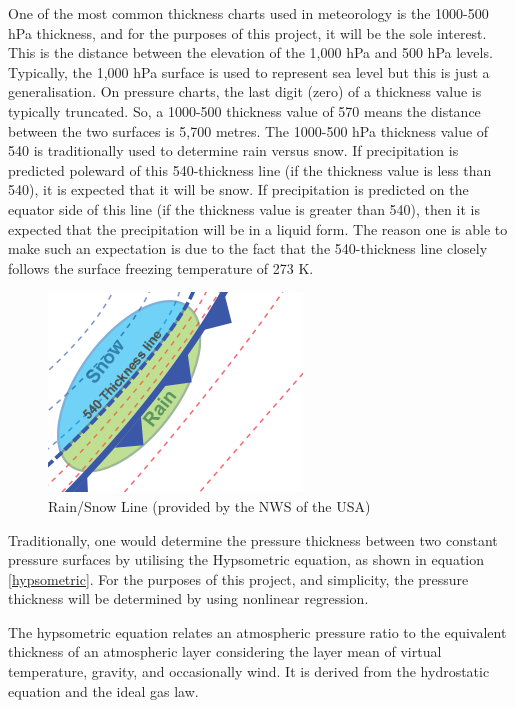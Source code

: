 One of the most common thickness charts used in meteorology is the 1000-500 hPa thickness, and for the purposes of this project, it will be the sole interest. This is the distance between the elevation of the 1,000 hPa and 500 hPa levels. Typically, the 1,000 hPa surface is used to represent sea level but this is just a generalisation. On pressure charts, the last digit (zero) of a thickness value is typically truncated. So, a 1000-500 thickness value of 570 means the distance between the two surfaces is 5,700 metres. The 1000-500 hPa thickness value of 540 is traditionally used to determine rain versus snow. If precipitation is predicted poleward of this 540-thickness line (if the thickness value is less than 540), it is expected that it will be snow. If precipitation is predicted on the equator side of this line (if the thickness value is greater than 540), then it is expected that the precipitation will be in a liquid form. The reason one is able to make such an expectation is due to the fact that the 540-thickness line closely follows the surface freezing temperature of 273 K\cite{thickness}.

\begin{figure}[H]
    \centering
    \includegraphics[width=.4\linewidth]{Images/rainsnow_line.png}
    \caption{Rain/Snow Line (provided by the NWS of the USA)}
    \label{rainsnow_line}
\end{figure}

Traditionally, one would determine the pressure thickness between two constant pressure surfaces by utilising the Hypsometric equation, as shown in equation \ref{hypsometric}. For the purposes of this project, and simplicity, the pressure thickness will be determined by using nonlinear regression. 

\begin{definition}
The hypsometric equation relates an atmospheric pressure ratio to the equivalent thickness of an atmospheric layer considering the layer mean of virtual temperature, gravity, and occasionally wind. It is derived from the hydrostatic equation and the ideal gas law.
\end{definition}

